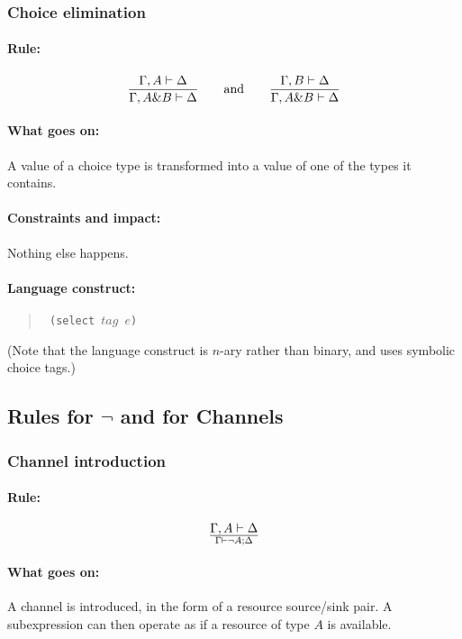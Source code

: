 \documentclass[a4paper]{article}
\begin{document}
\subsubsection{Choice elimination}


\paragraph{Rule:}
$$
{{
  \Gamma, A \vdash \Delta
}\over{
  \Gamma, A \& B \vdash \Delta
}}
\qquad \textrm{and} \qquad
{{
  \Gamma, B \vdash \Delta
}\over{
  \Gamma, A \& B \vdash \Delta
}}
$$

\paragraph{What goes on:} A value of a choice type is transformed into
a value of one of the types it contains.

\paragraph{Constraints and impact:} Nothing else happens.
\paragraph{Language construct:}
\begin{quote}\tt
(select $\mathit{tag}$ $e$)
\end{quote}
(Note that the language construct is $n$-ary rather than binary, and
uses symbolic choice tags.)


\subsection{Rules for $\lnot$ and for Channels}

\subsubsection{Channel introduction}

\paragraph{Rule:}
$$
{
  \Gamma, A \vdash \Delta
}\over{
  \Gamma \vdash \lnot A; \Delta
}
$$

\paragraph{What goes on:} A channel is introduced, in the form of a
resource source/sink pair. A subexpression can then operate as if a
resource of type $A$ is available.
\end{document}
